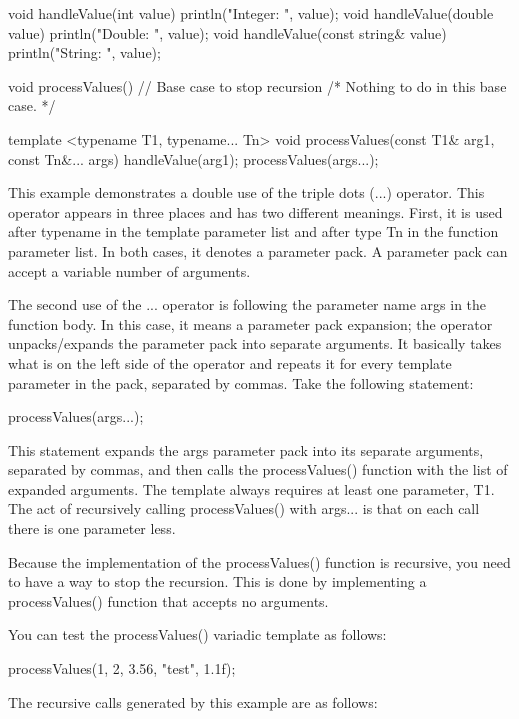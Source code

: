 \begin{cpp}
void handleValue(int value) { println("Integer: {}", value); }
void handleValue(double value) { println("Double: {}", value); }
void handleValue(const string& value) { println("String: {}", value); }

void processValues() // Base case to stop recursion
{ /* Nothing to do in this base case. */ }

template <typename T1, typename... Tn>
void processValues(const T1& arg1, const Tn&... args)
{
    handleValue(arg1);
    processValues(args...);
}
\end{cpp}

This example demonstrates a double use of the triple dots (...) operator. This operator appears in three places and has two different meanings. First, it is used after typename in the template parameter list and after type Tn in the function parameter list. In both cases, it denotes a parameter pack.
A parameter pack can accept a variable number of arguments.

The second use of the ... operator is following the parameter name args in the function body. In this case, it means a parameter pack expansion; the operator unpacks/expands the parameter pack into separate arguments. It basically takes what is on the left side of the operator and repeats it for every template parameter in the pack, separated by commas. Take the following statement:

\begin{cpp}
processValues(args...);
\end{cpp}

This statement expands the args parameter pack into its separate arguments, separated by commas, and then calls the processValues() function with the list of expanded arguments. The template always requires at least one parameter, T1. The act of recursively calling processValues() with args... is that on each call there is one parameter less.

Because the implementation of the processValues() function is recursive, you need to have a way to stop the recursion. This is done by implementing a processValues() function that accepts no arguments.

You can test the processValues() variadic template as follows:

\begin{cpp}
processValues(1, 2, 3.56, "test", 1.1f);
\end{cpp}

The recursive calls generated by this example are as follows:


